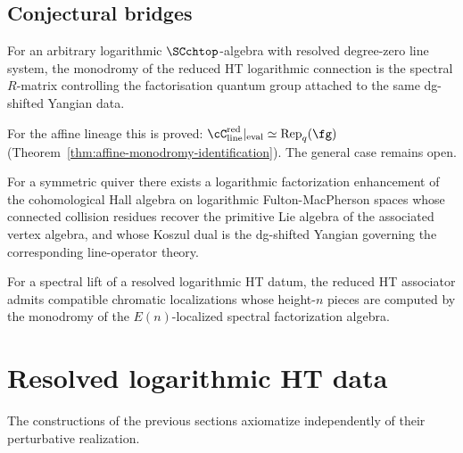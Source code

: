 \subsection{Conjectural bridges}

\begin{conjecture}%
For an arbitrary logarithmic $\SCchtop$-algebra with resolved degree-zero line system, the monodromy of the reduced HT logarithmic connection is the spectral $R$-matrix controlling the factorisation quantum group attached to the same dg-shifted Yangian data.

For the affine lineage this is proved: $\cC_{\mathrm{line}}^{\mathrm{red}}|_{\mathrm{eval}} \simeq \mathrm{Rep}_q(\fg)$ (Theorem~\ref{thm:affine-monodromy-identification}). The general case remains open.
\end{conjecture}

\begin{conjecture}%
For a symmetric quiver there exists a logarithmic factorization enhancement of the cohomological Hall algebra on logarithmic Fulton-MacPherson spaces whose connected collision residues recover the primitive Lie algebra of the associated vertex algebra, and whose Koszul dual is the dg-shifted Yangian governing the corresponding line-operator theory.
\end{conjecture}

\begin{conjecture}%
For a spectral lift of a resolved logarithmic HT datum, the reduced HT associator admits compatible chromatic localizations whose height-$n$ pieces are computed by the monodromy of the $E(n)$-localized spectral factorization algebra.
\end{conjecture}

\section{Resolved logarithmic HT data}%

The constructions of the previous sections axiomatize independently of their perturbative realization.

